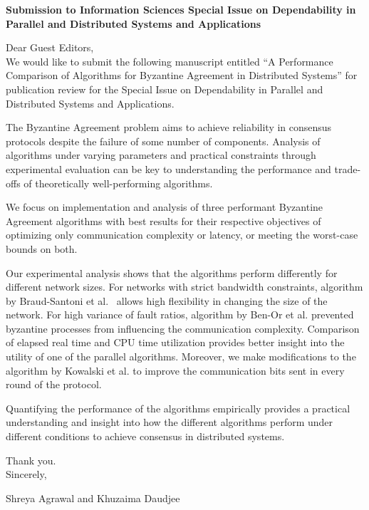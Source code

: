 \begin{center}

\textbf{Submission to Information Sciences Special Issue on Dependability in Parallel and Distributed Systems and Applications}
\end{center}


\noindent Dear Guest Editors, \\

We would like to submit the following manuscript entitled
``A Performance Comparison of Algorithms for Byzantine
Agreement in Distributed Systems'' for publication review for the 
Special Issue on Dependability in Parallel and Distributed Systems and Applications.

The Byzantine Agreement problem aims to achieve reliability in consensus
protocols despite the failure of some number of components.  
Analysis of algorithms under varying parameters and practical constraints through experimental evaluation can be key to understanding the performance and trade-offs of theoretically well-performing algorithms.

We focus on implementation and analysis of three performant Byzantine
Agreement algorithms with best results for their respective objectives of
optimizing only communication complexity or latency, or meeting the
worst-case bounds on both.

Our experimental analysis shows that the algorithms perform differently for different network sizes.
For networks with strict bandwidth constraints, algorithm by
Braud-Santoni et al.~\cite{BGH13} allows high flexibility in changing the size
of the network. For high variance of fault ratios, algorithm by Ben-Or et al.
\cite{BPV06} prevented byzantine processes from influencing the communication
complexity. Comparison of elapsed real time and CPU time utilization provides
better insight into the utility of one of the parallel algorithms.  Moreover,
we make modifications to the algorithm by Kowalski et al. \cite{KM13} to
improve the communication bits sent in every round of the protocol.

Quantifying the performance of the algorithms empirically provides a practical
understanding and insight into how the different algorithms perform under different
conditions to achieve consensus in distributed systems.

Thank you. \\

\noindent Sincerely,

\noindent Shreya Agrawal and Khuzaima Daudjee 

